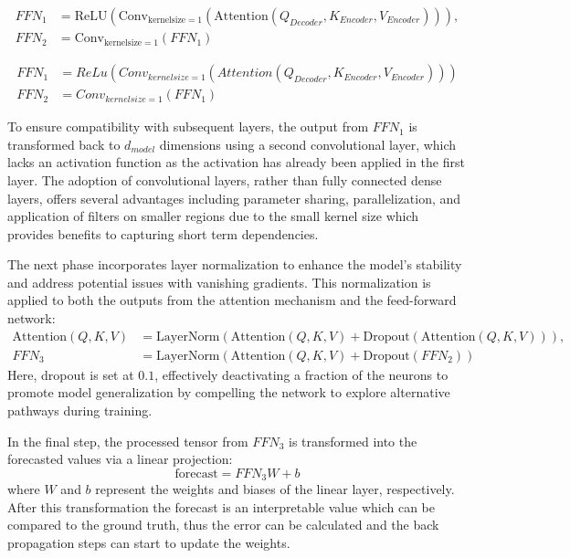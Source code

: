 \documentclass{article}
\begin{document}
\begin{align}
    FFN_1 &= \text{ReLU}(\text{Conv}_{\text{kernelsize} = 1}(\text{Attention}(Q_{Decoder}, K_{Encoder}, V_{Encoder}))), \\
    FFN_2 &= \text{Conv}_{\text{kernelsize} = 1}(FFN_1)
\end{align}

\begin{align}\label{eq: decoder-ffn}
    FFN_1 &= ReLu(Conv_{kernelsize = 1}(Attention(Q_{Decoder}, K_{Encoder}, V_{Encoder}))) \\
    FFN_2 &= Conv_{kernelsize = 1}(FFN_1)
\end{align}

To ensure compatibility with subsequent layers, the output from $FFN_1$ is transformed back to $d_{model}$ dimensions using a second convolutional layer, which lacks an activation function as the activation has already been applied in the first layer. The adoption of convolutional layers, rather than fully connected dense layers, offers several advantages including parameter sharing, parallelization, and application of filters on smaller regions due to the small kernel size which provides benefits to capturing short term dependencies.

The next phase incorporates layer normalization to enhance the model's stability and address potential issues with vanishing gradients. This normalization is applied to both the outputs from the attention mechanism and the feed-forward network:
\begin{align}
    \text{Attention}(Q,K,V) &= \text{LayerNorm}(\text{Attention}(Q,K,V) + \text{Dropout}(\text{Attention}(Q,K,V))), \\
    FFN_3 &= \text{LayerNorm}(\text{Attention}(Q,K,V) + \text{Dropout}(FFN_2))
\end{align}
Here, dropout is set at $0.1$, effectively deactivating a fraction of the neurons to promote model generalization by compelling the network to explore alternative pathways during training.

In the final step, the processed tensor from $FFN_3$ is transformed into the forecasted values via a linear projection:
\begin{equation}
    \text{forecast} = FFN_3 W + b
\end{equation}
where $W$ and $b$ represent the weights and biases of the linear layer, respectively. After this transformation the forecast is an interpretable value which can be compared to the ground truth, thus the error can be calculated and the back propagation steps can start to update the weights.
\end{document}
